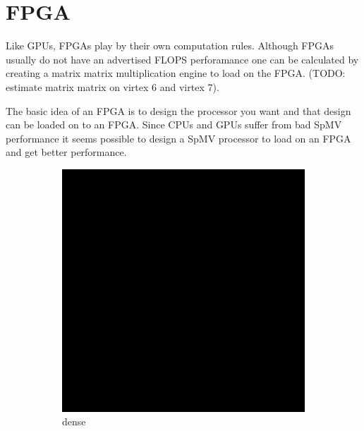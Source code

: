 \section{FPGA}
Like GPUs, FPGAs play by their own computation rules. Although FPGAs usually do not have an advertised FLOPS perforamance one can be calculated by creating a matrix matrix multiplication engine to load on the FPGA. (TODO: estimate matrix matrix on virtex 6 and virtex 7).
\par The basic idea of an FPGA is to design the processor you want and that design can be loaded on to an FPGA. Since CPUs and GPUs suffer from bad SpMV performance it seems possible to design a SpMV processor to load on an FPGA and get better performance.
\begin{figure}
\begin{multicols}{3}
\begin{subfigure}{\linewidth}
\includegraphics[width=\linewidth]{images/dense}
\caption{dense}
\end{subfigure}
\begin{subfigure}{\linewidth}

\end{subfigure}
\end{multicols}
\end{figure}
